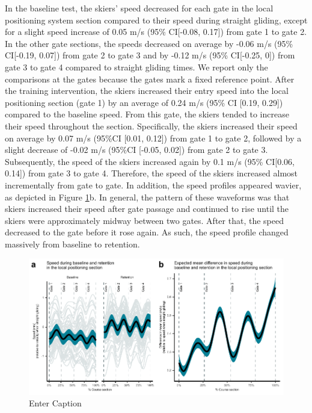 In the baseline test, the skiers’ speed decreased for each gate in the local positioning system section compared to their speed during straight gliding, except for a slight speed increase of 0.05 m/s (95\% CI[-0.08, 0.17]) from gate 1 to gate 2. In the other gate sections, the speeds decreased on average by -0.06 m/s (95\% CI[-0.19, 0.07]) from gate 2 to gate 3 and by -0.12 m/s (95\% CI[-0.25, 0]) from gate 3 to gate 4 compared to straight gliding times. We report only the comparisons at the gates because the gates mark a fixed reference point. After the training intervention, the skiers increased their entry speed into the local positioning section (gate 1) by an average of 0.24 m/s (95\% CI [0.19, 0.29]) compared to the baseline speed. From this gate, the skiers tended to increase their speed throughout the section. Specifically, the skiers increased their speed on average by 0.07 m/s (95\%CI [0.01, 0.12]) from gate 1 to gate 2, followed by a slight decrease of -0.02 m/s (95\%CI [-0.05, 0.02]) from gate 2 to gate 3. Subsequently, the speed of the skiers increased again by 0.1 m/s (95\% CI[0.06, 0.14]) from gate 3 to gate 4. Therefore, the speed of the skiers increased almost incrementally from gate to gate. In addition, the speed profiles appeared wavier, as depicted in Figure \ref{fig:lps_speed}b. In general, the pattern of these waveforms was that skiers increased their speed after gate passage and continued to rise until the skiers were approximately midway between two gates. After that, the speed decreased to the gate before it rose again. As such, the speed profile changed massively from baseline to retention. 

\begin{figure}
    \centering
    \includegraphics[width=1\linewidth]{figure/figure_speed.pdf}
    \caption{Enter Caption}
    \label{fig:lps_speed}
\end{figure}


